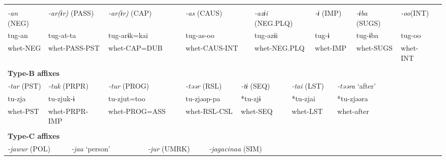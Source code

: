 \tabletail{}
\tablelasttail{}
\begin{tabularx}{\textwidth}{XXXXXXXXXXXXXXXXXXXX}
\lsptoprule
\multicolumn{20}{X}{{\bfseries Type-A affixes}}\\
{ \textit{{}-an} (NEG)} & \multicolumn{3}{X}{{ \textit{{}-ar(ɨr)} (PASS)}} & \multicolumn{3}{X}{{ \textit{{}-ar(ɨr)} (CAP)}} & \multicolumn{4}{X}{{ \textit{{}-as} (CAUS)}} & \multicolumn{4}{X}{{ \textit{{}-azɨi} (NEG.PLQ)}} & \multicolumn{2}{X}{{ \textit{{}-ɨ} (IMP)}} & { \textit{{}-ɨba} (SUGS)} & { \textit{{}-oo}(INT)} & \\
{ tug-an} & \multicolumn{3}{X}{{ tug-at-ta}} & \multicolumn{3}{X}{{ tug-arɨk=kai}} & \multicolumn{4}{X}{{ tug-as-oo}} & \multicolumn{4}{X}{{ tug-azɨi}} & \multicolumn{2}{X}{{ tug-ɨ}} & { tug-ɨba} & { tug-oo} & \\
whet-NEG & \multicolumn{3}{X}{whet-PASS-PST} & \multicolumn{3}{X}{whet-CAP=DUB} & \multicolumn{4}{X}{whet-CAUS-INT} & \multicolumn{4}{X}{whet-NEG.PLQ} & \multicolumn{2}{X}{whet-IMP} & whet-SUGS & whet-INT & \\
\multicolumn{20}{X}{}\\
\multicolumn{20}{X}{{\bfseries Type-B affixes}}\\
{ \textit{{}-tar} (PST)} & \multicolumn{3}{X}{{ \textit{{}-tuk} (PRPR)}} & \multicolumn{3}{X}{{ \textit{{}-tur} (PROG)}} & \multicolumn{3}{X}{{ \textit{{}-təər} (RSL)}} & \multicolumn{3}{X}{{ \textit{{}-tɨ} (SEQ)}} & \multicolumn{3}{X}{{ \textit{{}-tai} (LST)}} & \multicolumn{4}{X}{{ \textit{{}-təəra} ‘after’}}\\
{ tu-zja} & \multicolumn{3}{X}{{ tu-zjuk-ɨ}} & \multicolumn{3}{X}{{ tu-zjut=too}} & \multicolumn{3}{X}{{ tu-zjəəp-pa}} & \multicolumn{3}{X}{{ *tu-zjɨ}} & \multicolumn{3}{X}{{ *tu-zjai}} & \multicolumn{4}{X}{{ *tu-zjəəra}}\\
whet-PST & \multicolumn{3}{X}{whet-PRPR-IMP} & \multicolumn{3}{X}{whet-PROG=ASS} & \multicolumn{3}{X}{whet-RSL-CSL} & \multicolumn{3}{X}{whet-SEQ} & \multicolumn{3}{X}{whet-LST} & \multicolumn{4}{X}{{ whet-after}}\\
& \multicolumn{3}{X}{} & \multicolumn{3}{X}{} & \multicolumn{3}{X}{} & \multicolumn{3}{X}{} & \multicolumn{3}{X}{} & \multicolumn{4}{X}{}\\
\multicolumn{20}{X}{{\bfseries Type-C affixes}}\\
\multicolumn{3}{X}{{ \textit{{}-jawur} (POL)}} & \multicolumn{2}{X}{{ \textit{{}-jaa} ‘person’}} & \multicolumn{3}{X}{{ \textit{{}-jur} (UMRK)}} & \multicolumn{4}{X}{{ \textit{{}-jagacinaa} (SIM)}} & \multicolumn{8}{X}{}\\

\end{tabularx}
